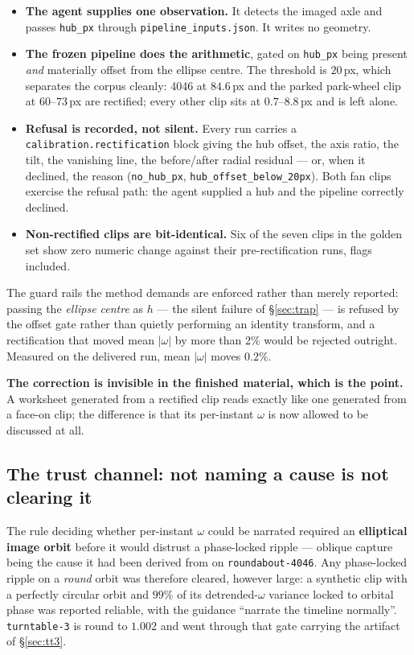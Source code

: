 \documentclass[11pt,a4paper]{article}
\begin{document}
\begin{itemize}
  \item \textbf{The agent supplies one observation.} It detects the imaged axle and passes
  \texttt{hub\_px} through \texttt{pipeline\_inputs.json}. It writes no geometry.
  \item \textbf{The frozen pipeline does the arithmetic}, gated on \texttt{hub\_px} being present
  \emph{and} materially offset from the ellipse centre. The threshold is $20$\,px, which separates
  the corpus cleanly: 4046 at $84.6$\,px and the parked park-wheel clip at $60$--$73$\,px are
  rectified; every other clip sits at $0.7$--$8.8$\,px and is left alone.
  \item \textbf{Refusal is recorded, not silent.} Every run carries a
  \texttt{calibration.rectification} block giving the hub offset, the axis ratio, the tilt, the
  vanishing line, the before/after radial residual --- or, when it declined, the reason
  (\texttt{no\_hub\_px}, \texttt{hub\_offset\_below\_20px}). Both fan clips exercise the refusal
  path: the agent supplied a hub and the pipeline correctly declined.
  \item \textbf{Non-rectified clips are bit-identical.} Six of the seven clips in the golden set
  show zero numeric change against their pre-rectification runs, flags included.
\end{itemize}

The guard rails the method demands are enforced rather than merely reported: passing the
\emph{ellipse centre} as $h$ --- the silent failure of \S\ref{sec:trap} --- is refused by the
offset gate rather than quietly performing an identity transform, and a rectification that moved
mean $|\omega|$ by more than 2\% would be rejected outright. Measured on the delivered run, mean
$|\omega|$ moves $0.2\%$.

\textbf{The correction is invisible in the finished material, which is the point.} A worksheet
generated from a rectified clip reads exactly like one generated from a face-on clip; the
difference is that its per-instant $\omega$ is now allowed to be discussed at all.

\subsection{The trust channel: not naming a cause is not clearing it}
\label{sec:trustchannel}

The rule deciding whether per-instant $\omega$ could be narrated required an \textbf{elliptical
image orbit} before it would distrust a phase-locked ripple --- oblique capture being the cause it
had been derived from on \texttt{roundabout-4046}. Any phase-locked ripple on a \emph{round} orbit
was therefore cleared, however large: a synthetic clip with a perfectly circular orbit and $99\%$ of
its detrended-$\omega$ variance locked to orbital phase was reported reliable, with the guidance
``narrate the timeline normally''. \texttt{turntable-3} is round to $1.002$ and went through that
gate carrying the artifact of \S\ref{sec:tt3}.
\end{document}
